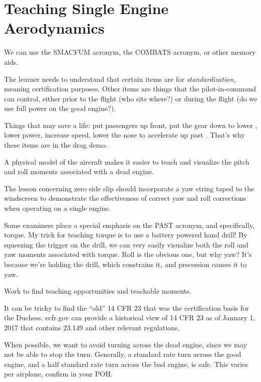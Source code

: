 \section{Teaching Single Engine Aerodynamics}

We can use the SMACFUM acronym, the COMBATS acronym, or other memory aids.

The learner needs to understand that certain items are for \emph{standardization}, meaning
certification purposes. Other items are things that the pilot-in-command can control, either prior
to the flight (who sits where?) or during the flight (do we use full power on the good engine?).

Things that may save a life: put passengers up front, put the gear down to lower \vmc, lower power, increase speed, lower the nose to accelerate up past \vmc. That's why these items are in the drag demo.

A physical model of the aircraft makes it easier to teach and visualize the pitch and roll moments
associated with a dead engine.

The lesson concerning zero side slip should incorporate a yaw string taped to the windscreen to demonstrate
the effectiveness of correct yaw and roll corrections when operating on a single engine.

Some examiners place a special emphasis on the PAST acronym, and specifically, torque. My trick for teaching torque
is to use a battery powered hand drill! By squeezing the trigger on the drill, we can very easily visualize both the
roll and yaw moments associated with torque. Roll is the obvious one, but why yaw? It's because we're holding
the drill, which constrains it, and precession causes it to yaw.

Work to find teaching opportunities and teachable moments.

It can be tricky to find the ``old'' 14 CFR 23 that was the certification basis for the Duchess. ecfr.gov can provide
a historical view of 14 CFR 23 as of January 1, 2017 that contains 23.149 and other relevant regulations.

When possible, we want to avoid turning across the dead engine, since we may not be able to
stop the turn. Generally, a standard rate turn across the good engine, and a half standard rate turn across
the bad engine, is safe. This varies per airplane, confirm in your POH.


